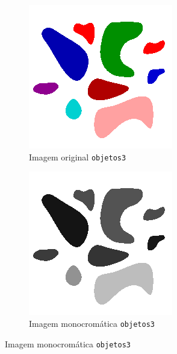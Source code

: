 \documentclass[brazilian,a4paper,twocolumn]{article}
\begin{document}
\begin{figure}[H]
            \begin{subfigure}{0.23\textwidth}
                \includegraphics[width=\textwidth,keepaspectratio]{objetos3}
                \caption{Imagem original \texttt{objetos3}}
                \label{fig:objetos3-orig}
            \end{subfigure}
            \hfill
            \begin{subfigure}{0.23\textwidth}
                \includegraphics[width=\textwidth,keepaspectratio]{objetos3-objetos}
                \caption{Imagem monocromática \texttt{objetos3}}
                \label{fig:objetos3-mono}
            \end{subfigure}


\end{figure}
\end{document}
